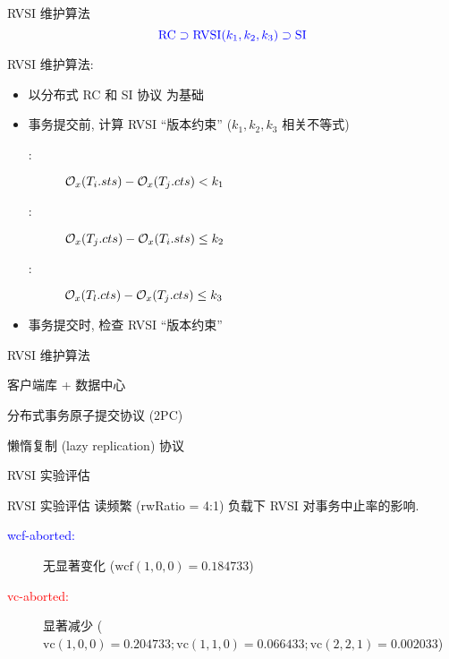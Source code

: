 \begin{frame}{RVSI 维护算法}
  \[
    \textcolor{blue}{\text{RC} \supset \text{RVSI}(k_1, k_2, k_3) \supset \text{SI}}
  \]

  \vspace{0.10cm}

  RVSI 维护算法:
  \begin{itemize}
    \item 以分布式 RC 和 SI 协议 为基础
    \item 事务提交前, 计算 RVSI ``版本约束'' ($k_1, k_2, k_3$ 相关不等式)
	  \begin{description}
		\item[\konebv{}:] $\mathcal{O}_{x}(T_i.{sts}) - \mathcal{O}_{x}(T_j.{cts}) < k_1$
		\item[\ktwofv{}:] $\mathcal{O}_{x}(T_j.{cts}) - \mathcal{O}_{x}(T_i.{sts}) \le k_2$
		\item[\kthreesv{}:] $\mathcal{O}_{x}(T_l.{cts}) - \mathcal{O}_{x}(T_j.{cts}) \le k_3$
	  \end{description}
    \item 事务提交时, 检查 RVSI ``版本约束''
  \end{itemize}

\end{frame}
\begin{frame}{RVSI 维护算法}
  \begin{description}
	\item[系统组件:] 客户端库 + 数据中心
	\item<2->[数据分区:] 分布式事务原子提交协议 {\small (2PC)}
	\item<2->[数据副本:] 懒惰复制 {\small (lazy replication)} 协议
  \end{description}

\end{frame}
\begin{frame}{RVSI 实验评估}
  
\end{frame}
\begin{frame}{RVSI 实验评估}
	{读频繁 (rwRatio = 4:1) 负载下 RVSI 对事务中止率的影响.}

  \begin{description}
	\item[\textcolor{blue}{wcf-aborted:}] 
	  无显著变化 {\small ($\text{wcf}(1,0,0) = 0.184733$)}
	\item[\textcolor{red}{vc-aborted:}] 显著减少 
	  {\small ($\text{vc}(1,0,0) = 0.204733;
	  \text{vc}(1,1,0) = 0.066433;
	  \text{vc}(2,2,1) = 0.002033$)}
  \end{description}
\end{frame}
